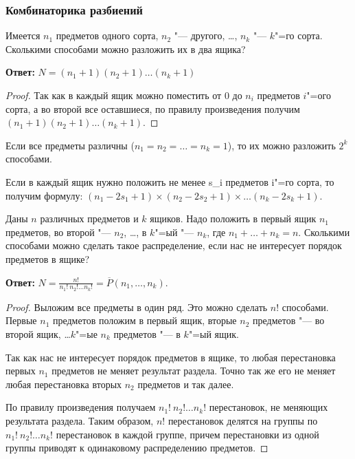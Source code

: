 \subsubsection{Комбинаторика разбиений}

\begin{theorem}
    Имеется $n_1$ предметов одного сорта, $n_2$ "--- другого, \dots , $n_k$ "--- $k$"=го сорта. Сколькими
способами можно разложить их в два ящика?

\textbf{Ответ:} $N = (n_1 + 1)(n_2 + 1) \dots (n_k + 1)$

\end{theorem} 

\begin{proof}
Так как в каждый ящик можно поместить от $0$ до
$n_i$ предметов $i$"=ого сорта, а во второй все оставшиеся, по правилу произведения
получим $(n_1 + 1)(n_2 + 1) \dots (n_k + 1)$.
\end{proof}

\begin{corollary}
    Если все предметы различны ($n_1=n_2=\dots=n_k=1$), то их можно разложить $2^k$
способами. 
\end{corollary}

\begin{corollary}
    Если в каждый ящик нужно положить не менее s_i предметов i"=го сорта, то
получим формулу: $(n_1-2s_1+1) \times (n_2-2s_2+1) \times \dots  (n_k-2s_k+1)$. 
\end{corollary}

\begin{theorem}
    Даны $n$ различных предметов и $k$ ящиков. 
Надо положить в первый ящик $n_1$
предметов, во второй "--- $n_2$, \dots, в $k$"=ый "--- $n_k$, 
где $n_1 +\dots + n_k = n$. Сколькими способами можно
сделать такое распределение, если нас не интересует порядок 
предметов в ящике? 

\textbf{Ответ:} $\displaystyle N =  \frac{n!}{n_1!~n_2!\dots n_k!} = \overline{P}(n_1, \dots, n_k)$.

\begin{proof}
    Выложим все предметы в один ряд. Это можно сделать $n!$ способами. Первые $n_1$
предметов положим в первый ящик, вторые $n_2$ предметов "--- во второй ящик, \dots $k$"=ые $n_k$
предметов "--- в $k$"=ый ящик. 

Так как нас не интересует порядок предметов в ящике, то любая
перестановка первых $n_1$ предметов не меняет результат раздела. Точно так же его не меняет
любая перестановка вторых $n_2$ предметов и так далее. 

По правилу произведения
получаем $n_1! ~n_2! \dots n_k!$ перестановок, не меняющих результата раздела. Таким образом, $n!$
перестановок делятся на группы по $n_1!~ n_2! \dots n_k!$ перестановок в каждой группе, причем
перестановки из одной группы приводят к одинаковому распределению предметов. 
\end{proof}

\end{theorem}


